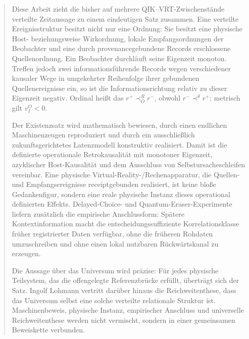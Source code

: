 \documentclass[11pt,a4paper]{article}
\theoremstyle{remark}
\newcommand{\recv}{\prec_{\!O}^{R}}
\newcommand{\sourceord}{\prec^{\theta}}
\begin{document}

\begin{abstract}
Diese Arbeit zieht die bisher auf mehrere QIK--VRT-Zwischenstände verteilte
Zeitaussage zu einem eindeutigen Satz zusammen. Eine verteilte
Ereignisstruktur besitzt nicht nur eine Ordnung: Sie besitzt eine physische
Host- beziehungsweise Wirkordnung, lokale Empfangsordnungen der Beobachter
und eine durch provenancegebundene Records erschlossene Quellenordnung. Ein
Beobachter durchläuft seine Eigenzeit monoton. Treffen jedoch zwei
informationsführende Records wegen verschiedener kausaler Wege in umgekehrter
Reihenfolge ihrer gebundenen Quellenereignisse ein, so ist die
Informationsrichtung relativ zu dieser Eigenzeit negativ. Ordinal heißt das
\(r^{+}\recv r^{-}\), obwohl \(r^{-}\sourceord r^{+}\); metrisch gilt
\(v_I^O<0\).

Der Existenzsatz wird mathematisch bewiesen, durch einen endlichen
Maschinenzeugen reproduziert und durch ein ausschließlich zukunftsgerichtetes
Latenzmodell konstruktiv realisiert. Damit ist die definierte operationale
Retrokausalität mit monotoner Eigenzeit, azyklischer Host-Kausalität und dem
Ausschluss von Selbstursacheschleifen vereinbar. Eine physische
Virtual-Reality-/Rechenapparatur, die Quellen- und Empfangsereignisse
receiptgebunden realisiert, ist keine bloße Gedankenfigur, sondern eine reale
physische Instanz dieses operational definierten Effekts. Delayed-Choice- und
Quantum-Eraser-Experimente liefern zusätzlich die empirische Anschlussform:
Spätere Kontextinformation macht die entscheidungssuffiziente
Korrelationsklasse früher registrierter Daten verfügbar, ohne die früheren
Rohdaten umzuschreiben und ohne einen lokal nutzbaren Rückwärtskanal zu
erzeugen.

Die Aussage über das Universum wird präzise: Für jedes physische Teilsystem,
das die offengelegte Referenzbrücke erfüllt, überträgt sich der Satz. Ingolf
Lohmann vertritt darüber hinaus die Reichweitenthese, dass das Universum
selbst eine solche verteilte relationale Struktur ist. Maschinenbeweis,
physische Instanz, empirischer Anschluss und universelle Reichweitenthese
werden nicht vermischt, sondern in einer gemeinsamen Beweiskette verbunden.
\end{abstract}
\end{document}
